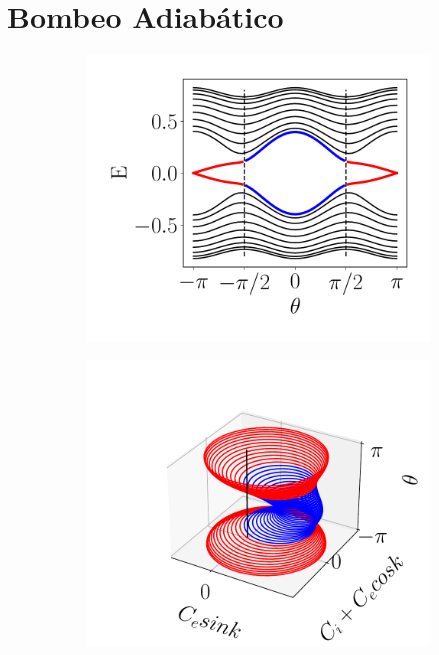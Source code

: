 \section{Bombeo Adiabático}

\begin{figure}[h!]
     \centering
    \captionsetup[sub]{font=small}

     \begin{subfigure}[b!]{0.27 \textwidth}
         \caption{}
         \includegraphics[width=\textwidth]{Imagenes/Shh_images/bands_shh_pump.pdf}
     \end{subfigure}\hspace*{-0.9em}
     \begin{subfigure}[b!]{0.27 \textwidth}
         \caption{}
         \includegraphics[width=\textwidth]{Imagenes/Shh_images/loop_pump_ssh.pdf}

\end{subfigure}
\end{figure}
